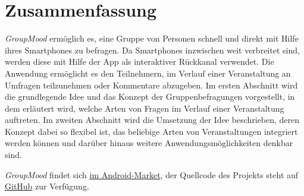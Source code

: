 \section*{Zusammenfassung}

\emph{GroupMood} ermöglich es, eine Gruppe von Personen schnell und direkt mit Hilfe ihres Smartphones zu befragen. Da Smartphones inzwischen weit verbreitet sind, werden diese mit Hilfe der App als interaktiver Rückkanal verwendet. Die Anwendung ermöglicht es den Teilnehmern, im Verlauf einer Veranstaltung an Umfragen teilzunehmen oder Kommentare abzugeben. Im ersten Abschnitt wird die grundlegende Idee und das Konzept der Gruppenbefragungen vorgestellt, in dem erläutert wird, welche Arten von Fragen im Verlauf einer Veranstaltung auftreten. Im zweiten Abschnitt wird die Umsetzung der Idee beschrieben, deren Konzept dabei so flexibel ist, das beliebige Arten von Veranstaltungen integriert werden können und darüber hinaus weitere Anwendungsmöglichkeiten denkbar sind.

\bigskip

\emph{GroupMood} findet sich \href{https://market.android.com/details?id=de.hsrm.mi.mobcomp.y2k11grp04}{im Android-Market}, der Quellcode des Projekts steht auf \href{https://github.com/tacker/GroupMood}{GitHub} zur Verfügung.